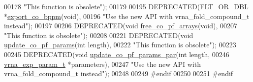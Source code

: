 \begin{DoxyCode}
00178 \textcolor{stringliteral}{"This function is obsolete"});
00179 
00195 DEPRECATED(\hyperlink{group__data__structures_ga31125aeace516926bf7f251f759b6126}{FLT\_OR\_DBL} *\hyperlink{group__part__func__global__deprecated_gad94c0133157bed6912fe7fe866e0039e}{export\_co\_bppm}(\textcolor{keywordtype}{void}),
00196 \textcolor{stringliteral}{"Use the new API with vrna\_fold\_compound\_t instead"});
00197 
00206 DEPRECATED(\textcolor{keywordtype}{void} \hyperlink{group__part__func__global__deprecated_gade3ce34ae8214811374b1d28a40dc247}{free\_co\_pf\_arrays}(\textcolor{keywordtype}{void}),
00207 \textcolor{stringliteral}{"This function is obsolete"});
00208 
00221 DEPRECATED(\textcolor{keywordtype}{void} \hyperlink{group__part__func__global__deprecated_ga6e0f36c1f9b7d9dd4bfbad914c1119e5}{update\_co\_pf\_params}(\textcolor{keywordtype}{int} length),
00222 \textcolor{stringliteral}{"This function is obsolete"});
00223 
00245 DEPRECATED(\textcolor{keywordtype}{void} \hyperlink{group__part__func__global__deprecated_ga75465d7e8793db68a434d83df9a2e794}{update\_co\_pf\_params\_par}(\textcolor{keywordtype}{int}               length,
00246                                         \hyperlink{group__energy__parameters_structvrna__exp__param__s}{vrna\_exp\_param\_t}  *parameters),
00247 \textcolor{stringliteral}{"Use the new API with vrna\_fold\_compound\_t instead"});
00248 
00249 \textcolor{preprocessor}{#endif}
00250 
00251 \textcolor{preprocessor}{#endif}
\end{DoxyCode}
